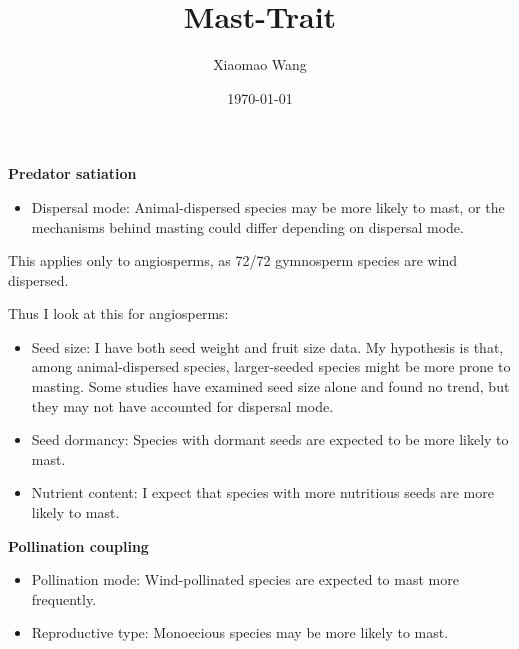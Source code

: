 \documentclass{article}
\title{Mast-Trait}
\author{Xiaomao Wang}
\date{\today}
\begin{document}


\maketitle

\textbf{Predator satiation}\\

\begin{itemize}
\item{Dispersal mode: Animal-dispersed species may be more likely to mast, or the mechanisms behind masting could differ depending on dispersal mode.}
\end{itemize}

This applies only to angiosperms, as 72/72  gymnosperm species are wind dispersed. 

Thus I look at this for angiosperms:


\begin{itemize}
\item{Seed size: I have both seed weight and fruit size data. My hypothesis is that, among animal-dispersed species, larger-seeded species might be more prone to masting. Some studies have examined seed size alone and found no trend, but they may not have accounted for dispersal mode.}
\end{itemize}

\begin{itemize}
\item{Seed dormancy: Species with dormant seeds are expected to be more likely to mast.}
\end{itemize}

\begin{itemize}
\item{Nutrient content: I expect that species with more nutritious seeds are more likely to mast.}
\end{itemize}

\textbf{Pollination coupling}\\
\begin{itemize}
\item{Pollination mode: Wind-pollinated species are expected to mast more frequently.}
\end{itemize}

\begin{itemize}
\item{Reproductive type: Monoecious species may be more likely to mast.}
\end{itemize}
\end{document}
